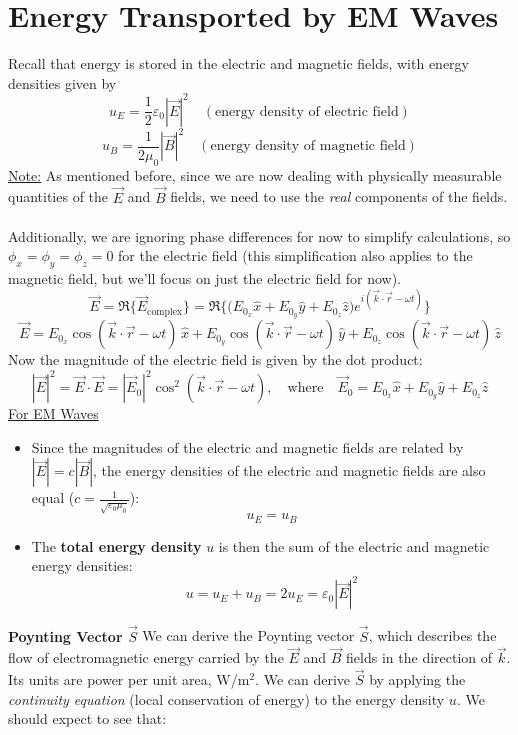 \documentclass[12pt]{article}
\begin{document}
\section*{Energy Transported by EM Waves}
Recall that energy is stored in the electric and magnetic fields, with energy densities given by
\[u_E = \frac{1}{2} \varepsilon_0 |\vec{E}|^2 \quad (\text{energy density of electric field})\]
\[u_B = \frac{1}{2 \mu_0} |\vec{B}|^2 \quad (\text{energy density of magnetic field})\]
\underline{Note:} As mentioned before, since we are now dealing with physically measurable quantities of the $\vec{E}$ and $\vec{B}$ fields, we need to use the \textit{real} components of the fields.\\\\
Additionally, we are ignoring phase differences for now to simplify calculations, so $\phi_x = \phi_y = \phi_z = 0$ for the electric field (this simplification also applies to the magnetic field, but we'll focus on just the electric field for now).
\[\vec{E} = \Re\! \Big\{ \vec{E}_{\text{complex}} \Big\} 
= \Re\! \Big\{ \big( E_{0_x} \hat{x} + E_{0_y} \hat{y} + E_{0_z} \hat{z} \big) e^{i (\vec{k} \cdot \vec{r} - \omega t)} \Big\}\]
\[\vec{E} = 
E_{0_x} \cos(\vec{k} \cdot \vec{r} - \omega t)\,\hat{x}
+ E_{0_y} \cos(\vec{k} \cdot \vec{r} - \omega t)\,\hat{y}
+ E_{0_z} \cos(\vec{k} \cdot \vec{r} - \omega t)\,\hat{z}\]
Now the magnitude of the electric field is given by the dot product:
\[|\vec{E}|^2 = \vec{E}\cdot\vec{E} = |\vec{E}_0|^2 \cos^2(\vec{k} \cdot \vec{r} - \omega t),\quad \text{where} \quad \vec{E}_0 = E_{0_x} \hat{x} + E_{0_y} \hat{y} + E_{0_z} \hat{z}\]
\underline{For EM Waves}
\begin{itemize}
    \item Since the magnitudes of the electric and magnetic fields are related by $|\vec{E}| = c |\vec{B}|$, the energy densities of the electric and magnetic fields are also equal ($c = \frac{1}{\sqrt{\varepsilon_0 \mu_0}}$):
    \[\boxed{u_E = u_B}\]
    \item The \textbf{total energy density} $u$ is then the sum of the electric and magnetic energy densities:
    \[\boxed{u = u_E + u_B = 2u_E = \varepsilon_0 |\vec{E}|^2}\]
\end{itemize}
\textbf{Poynting Vector $\vec{S}$}
We can derive the Poynting vector $\vec{S}$, which describes the flow of electromagnetic energy carried by the $\vec{E}$ and $\vec{B}$ fields in the direction of $\vec{k}$. Its units are power per unit area, W/m$^2$. We can derive $\vec{S}$ by applying the \textit{continuity equation} (local conservation of energy) to the energy density $u$. We should expect to see that:
\end{document}
